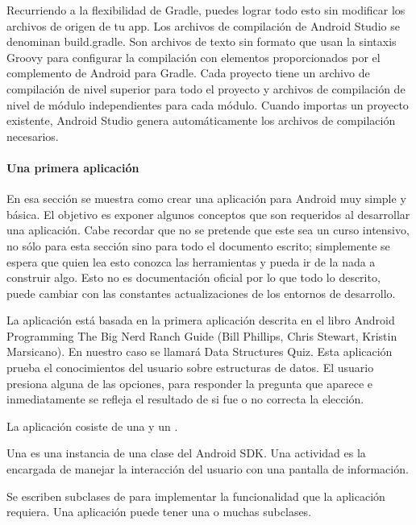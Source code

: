 Recurriendo a la flexibilidad de Gradle, puedes lograr todo esto sin modificar los archivos de origen de tu app. Los archivos de compilación de Android Studio se denominan build.gradle. Son archivos de texto sin formato que usan la sintaxis Groovy para configurar la compilación con elementos proporcionados por el complemento de Android para Gradle. Cada proyecto tiene un archivo de compilación de nivel superior para todo el proyecto y archivos de compilación de nivel de módulo independientes para cada módulo. Cuando importas un proyecto existente, Android Studio genera automáticamente los archivos de compilación necesarios.


\paragraph{Una primera aplicación}
\label{\detokenize{dev_docs:una-primera-aplicacion}}
En esa sección se muestra como crear una aplicación para Android muy simple
y básica. El objetivo es exponer algunos conceptos que son requeridos al
desarrollar una aplicación. Cabe recordar que no se pretende que este sea un
curso intensivo, no sólo para esta sección sino para todo el documento escrito;
simplemente se espera que quien lea esto conozca las herramientas y pueda ir
de la nada a construir algo. Esto no es documentación oficial por lo que todo
lo descrito, puede cambiar con las constantes actualizaciones de los entornos
de desarrollo.

La aplicación está basada en la primera aplicación descrita en el libro Android
Programming The Big Nerd Ranch Guide (Bill Phillips, Chris Stewart, Kristin Marsicano).
En nuestro caso se llamará Data Structures Quiz. Esta aplicación prueba el
conocimientos del usuario sobre estructuras de datos. El usuario presiona
alguna de las opciones, para responder la pregunta que aparece e inmediatamente
se refleja el resultado de si fue o no correcta la elección.

La aplicación cosiste de una  y un .

Una  es una instancia de  una clase del Android SDK.
Una actividad es la encargada de manejar la interacción del usuario con una
pantalla de información.

Se escriben subclases de  para implementar la funcionalidad que la
aplicación requiera. Una aplicación puede tener una o muchas subclases.


